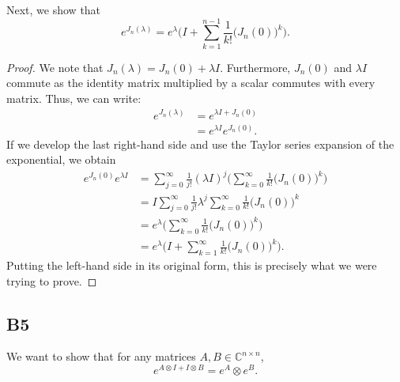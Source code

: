 \documentclass[11pt]{article}
\newcommand{\complex}{\mathbb{C}} %
\newcommand{\kp}{\otimes} %
\begin{document}
Next, we show that
\[
    e^{J_n(\lambda)}=e^{\lambda}\Bigg(I+\sum_{k=1}^{n-1}\frac{1}{k!}\big(J_n(0)\big)^k\Bigg).
\]
\begin{proof}
We note that $J_n(\lambda)=J_n(0)+\lambda I$.
Furthermore, $J_n(0)$ and $\lambda I$ commute as the identity matrix multiplied by a scalar commutes with every matrix.
Thus, we can write:
\begin{align*}
    e^{J_n(\lambda)}&=e^{\lambda I+J_n(0)}\\
    &=e^{\lambda I}e^{J_n(0)}.
\end{align*}
If we develop the last right-hand side and use the Taylor series expansion of the exponential, we obtain
\begin{align*}
    e^{J_n(0)}e^{\lambda I}&=\sum_{j=0}^{\infty}\frac{1}{j!}(\lambda I)^j\Bigg(\sum_{k=0}^{\infty}\frac{1}{k!}\big(J_n(0)\big)^k\Bigg)\\
    &=I\sum_{j=0}^{\infty}\frac{1}{j!}\lambda ^j\sum_{k=0}^{\infty}\frac{1}{k!}\big(J_n(0)\big)^k\\
    &=e^{\lambda}\Bigg(\sum_{k=0}^{\infty}\frac{1}{k!}\big(J_n(0)\big)^k\Bigg)\\
    &=e^{\lambda}\Bigg(I+\sum_{k=1}^{\infty}\frac{1}{k!}\big(J_n(0)\big)^k\Bigg).
\end{align*}
Putting the left-hand side in its original form, this is precisely what we were trying to prove.
\end{proof}

\subsection*{B5}
We want to show that for any matrices \(A, B \in \complex^{n \times n}\),
\[
    e^{A\kp I+I\kp B}=e^A\kp e^B.
\]
\end{document}
